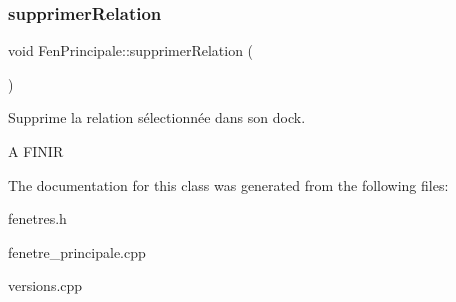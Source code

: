 \subsubsection{\texorpdfstring{supprimer\+Relation}{supprimerRelation}}
{\footnotesize\ttfamily void Fen\+Principale\+::supprimer\+Relation (\begin{DoxyParamCaption}{ }\end{DoxyParamCaption})\hspace{0.3cm}{\ttfamily [slot]}}



Supprime la relation sélectionnée dans son dock. 

A F\+I\+N\+IR 

The documentation for this class was generated from the following files\+:\begin{DoxyCompactItemize}
\item 
fenetres.\+h\item 
fenetre\+\_\+principale.\+cpp\item 
versions.\+cpp\end{DoxyCompactItemize}
